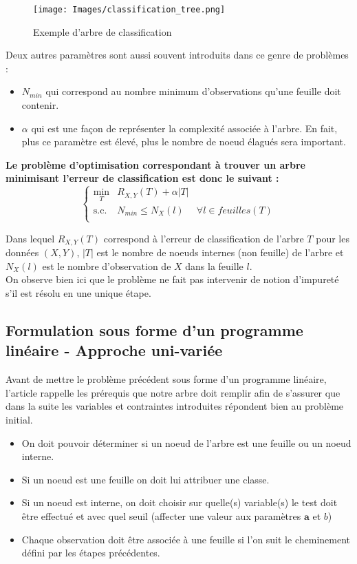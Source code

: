 \documentclass[12pt]{report}
\begin{document}
\begin{figure}
    \centering
    \texttt{[image: Images/classification\_tree.png]}
    \caption{Exemple d'arbre de classification}
    \label{classification_tree}
\end{figure}

Deux autres paramètres sont aussi souvent introduits dans ce genre de problèmes :
\begin{itemize}
    \item \(N_{min}\) qui correspond au nombre minimum d'observations qu'une feuille doit contenir.
    \item \(\alpha\) qui est une façon de représenter la complexité associée à l'arbre. En fait, plus ce paramètre est élevé, plus le nombre de noeud élagués sera important.
\end{itemize}

\textbf{Le problème d'optimisation correspondant à trouver un arbre minimisant l'erreur de classification est donc le suivant :}
\[
\left\{
  \begin{array}{rll}
    \min_{T} & R_{X,Y}(T)+\alpha |T|\\
    \mbox{s.c.} & N_{min} \leq N_X(l) 
    & \forall l \in feuilles(T)\\
  \end{array}
\right.
\]

Dans lequel \(R_{X,Y}(T)\) correspond à l'erreur de classification de l'arbre \(T\) pour les données \((X,Y)\), \(|T|\) est le nombre de noeuds internes (non feuille) de l'arbre et \(N_X(l)\) est le nombre d'observation de \(X\) dans la feuille \(l\).\\
On observe bien ici que le problème ne fait pas intervenir de notion d'impureté s'il est résolu en une unique étape.


\subsection{Formulation sous forme d'un programme linéaire - Approche uni-variée}
Avant de mettre le problème précédent sous forme d'un programme linéaire, l'article rappelle les prérequis que notre arbre doit remplir afin de s'assurer que dans la suite les variables et contraintes introduites répondent bien au problème initial.
\begin{itemize}
    \item On doit pouvoir déterminer si un noeud de l'arbre est une feuille ou un noeud interne.
    \item Si un noeud est une feuille on doit lui attribuer une classe.
    \item Si un noeud est interne, on doit choisir sur quelle(s) variable(s) le test doit être effectué et avec quel seuil (affecter une valeur aux paramètres \(\mathbf{a}\) et \(b\))
    \item Chaque observation doit être associée à une feuille si l'on suit le cheminement défini par les étapes précédentes.
\end{itemize}\\
\vspace{0.5cm}
\end{document}
